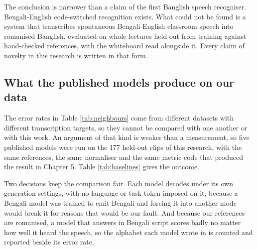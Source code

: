 The conclusion is narrower than a claim of the first Banglish speech recogniser.
Bengali-English code-switched recognition exists. What could not be found is a system
that transcribes spontaneous Bengali-English classroom speech into romanised Banglish,
evaluated on whole lectures held out from training against hand-checked references, with
the whiteboard read alongside it. Every claim of novelty in this research is written in
that form.

\subsection{What the published models produce on our data}
\label{sec:baselines}

The error rates in Table \ref{tab:neighbours} come from different datasets with different
transcription targets, so they cannot be compared with one another or with this work. An
argument of that kind is weaker than a measurement, so five published models were run on
the 177 held-out clips of this research, with the same references, the same normaliser and
the same metric code that produced the result in Chapter 5. Table \ref{tab:baselines}
gives the outcome.

Two decisions keep the comparison fair. Each model decodes under its own generation
settings, with no language or task token imposed on it, because a Bengali model was
trained to emit Bengali and forcing it into another mode would break it for reasons that
would be our fault. And because our references are romanised, a model that answers in
Bengali script scores badly no matter how well it heard the speech, so the alphabet each
model wrote in is counted and reported beside its error rate.

